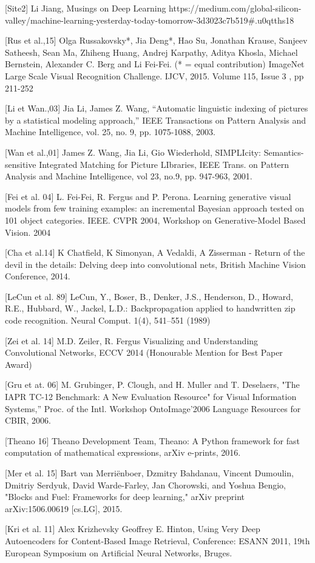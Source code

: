 [Site2] Li Jiang, Musings on Deep Learning https://medium.com/global-silicon-valley/machine-learning-yesterday-today-tomorrow-3d3023c7b519\#.u0qtths18


[Rus et al.,15] Olga Russakovsky*, Jia Deng*, Hao Su, Jonathan Krause, Sanjeev Satheesh, Sean Ma, Zhiheng Huang, Andrej Karpathy, Aditya Khosla, Michael Bernstein, Alexander C. Berg and Li Fei-Fei. (* = equal contribution) ImageNet Large Scale Visual Recognition Challenge. IJCV, 2015. Volume 115, Issue 3 , pp 211-252 

[Li et Wan.,03] Jia Li, James Z. Wang, ``Automatic linguistic indexing of pictures by a statistical modeling approach,'' IEEE Transactions on Pattern Analysis and Machine Intelligence, vol. 25, no. 9, pp. 1075-1088, 2003.

[Wan et al.,01] James Z. Wang, Jia Li, Gio Wiederhold, SIMPLIcity: Semantics-sensitive Integrated Matching for Picture LIbraries, IEEE Trans. on Pattern Analysis and Machine Intelligence, vol 23, no.9, pp. 947-963, 2001.

[Fei et al. 04] L. Fei-Fei, R. Fergus and P. Perona. Learning generative visual models from few training examples: an incremental Bayesian approach tested on 101 object categories. IEEE. CVPR 2004, Workshop on Generative-Model Based Vision. 2004

[Cha et al.14] K Chatfield, K Simonyan, A Vedaldi, A Zisserman - Return of the devil in the details: Delving deep into convolutional nets, British Machine Vision Conference, 2014.

[LeCun et al. 89] LeCun, Y., Boser, B., Denker, J.S., Henderson, D., Howard, R.E., Hubbard, W., Jackel, L.D.: Backpropagation applied to handwritten zip code recognition. Neural
Comput. 1(4), 541–551 (1989)

[Zei et al. 14] M.D. Zeiler, R. Fergus Visualizing and Understanding Convolutional Networks, ECCV 2014 (Honourable Mention for Best Paper Award)

[Gru et at. 06] M. Grubinger, P. Clough, and H. Muller and T. Deselaers, "The IAPR TC-12 Benchmark: A New Evaluation Resource" for Visual Information Systems,” Proc. of the Intl. Workshop OntoImage’2006 Language Resources for CBIR, 2006.

[Theano 16] Theano Development Team, Theano: A {Python} framework for fast computation of mathematical expressions, arXiv e-prints, 2016.

[Mer et al. 15] Bart van Merriënboer, Dzmitry Bahdanau, Vincent Dumoulin, Dmitriy Serdyuk, David Warde-Farley, Jan Chorowski, and Yoshua Bengio, "Blocks and Fuel: Frameworks for deep learning," arXiv preprint arXiv:1506.00619 [cs.LG], 2015.

[Kri et al. 11] Alex Krizhevsky Geoffrey E. Hinton, Using Very Deep Autoencoders for Content-Based Image Retrieval, Conference: ESANN 2011, 19th European Symposium on Artificial Neural Networks, Bruges.